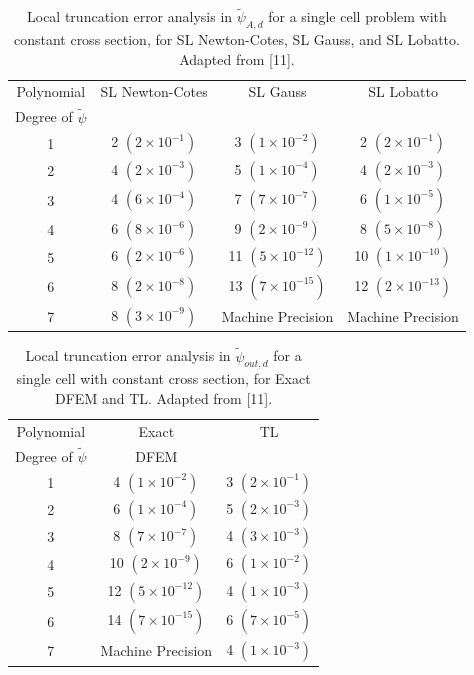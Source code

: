 \begin{table}[!hbp]
\centering
\caption{Local truncation error analysis in $\widetilde{\psi}_{A,d}$ for a single cell problem with constant cross section, for SL Newton-Cotes, SL Gauss, and SL Lobatto.   Adapted from [11].}
\begin{tabular}{|c|c|c|c|} 
\hline
  Polynomial 										 & SL Newton-Cotes 					& SL Gauss 			 						& SL Lobatto  \\
  Degree  of $\widetilde{\psi}$	  & {}		 							 			& {}   											&	 {}   \\
  	\hline
				1   									  &	2 $(2\times 10^{-1})$			&	3 $(1\times 10^{-2})$			&	2 $(2\times 10^{-1})$		\\
		\hline
				2   							     &	4 $(2\times 10^{-3})$			&	5 $(1\times 10^{-4})$			&	4 $(2\times 10^{-3})$		\\
		\hline	
				3   								  	&	4 $(6\times 10^{-4})$			&	 7 $(7\times 10^{-7})$		&	6 $(1\times 10^{-5})$\\
		\hline
				4   									  &	6 $(8\times 10^{-6})$			&	9 $(2\times 10^{-9})$			&	8 $(5\times 10^{-8})$	\\
		\hline
				5   								  	&	6 $(2\times 10^{-6})$			&	11 $(5\times 10^{-12})$		&	10 $(1\times 10^{-10})$\\
		\hline	
				6   								  	&	8 $(2\times 10^{-8})$			&	13 $(7\times 10^{-15})$		&	12 $(2\times 10^{-13})$\\
		\hline
				7   								  	&	8 $(3\times 10^{-9})$			&	Machine Precision					&	Machine Precision   \\
		\hline	
\end{tabular}
\label{tbl:taylor_avg_part2} 
\end{table}
%
\pagebreak
%
\begin{table}[!htp]
\centering
\caption{Local truncation error analysis in $\widetilde{\psi}_{out,d}$ for a single cell with constant cross section, for Exact DFEM and TL.   Adapted from [11].}
\begin{tabular}{|c|c|c|} 
\hline
  Polynomial 										  & Exact 										& TL  	\\
  Degree  of $\widetilde{\psi}$		&   DFEM										& {}	\\
  	\hline
				1   											&  4 $(1\times 10^{-2})$		& 3 $(2\times 10^{-1})$	\\
		\hline
				2   											&  6 $(1\times 10^{-4})$		& 5 $(2\times 10^{-3})$	\\
		\hline	
				3   											&  8 $(7\times 10^{-7})$		& 4 $(3\times 10^{-3})$	\\
		\hline
				4   											&  10 $(2\times 10^{-9})$		& 6 $(1\times 10^{-2})$	\\
		\hline
				5   											&  12 $(5\times 10^{-12})$	& 4 $(1\times 10^{-3})$	\\
		\hline		
				6   											&  14 $(7\times 10^{-15})$	& 6 $(7\times 10^{-5})$	\\
		\hline
				7   											&  Machine Precision				& 4 $(1\times 10^{-3})$	\\
		\hline
\end{tabular}
\label{tbl:taylor_out_part1} 
\end{table}
